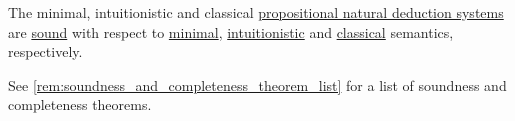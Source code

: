 \begin{theorem}\label{thm:propositional_natural_deduction_soundness}
  The minimal, intuitionistic and classical \hyperref[def:propositional_natural_deduction_systems]{propositional natural deduction systems} are \hyperref[def:abstract_logic/soundness]{sound} with respect to \hyperref[def:minimal_propositional_semantics]{minimal}, \hyperref[def:propositional_semantics/intuitionistic]{intuitionistic} and \hyperref[def:propositional_semantics/classical]{classical} semantics, respectively.
\end{theorem}
\begin{comments}
  \item See \cref{rem:soundness_and_completeness_theorem_list} for a list of soundness and completeness theorems.
\end{comments}
